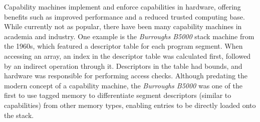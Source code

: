 Capability machines implement and enforce capabilities in hardware, 
offering benefits such as improved performance and a reduced trusted 
computing base. While currently not as popular, there have been many 
capability machines in academia and industry. One example is the \textit{Burroughs B5000} 
stack machine from the 1960s, which featured a descriptor table for each program segment. 
When accessing an array, an index in the descriptor table was calculated first, 
followed by an indirect operation through it. Descriptors in the table had bounds,
 and hardware was responsible for performing access checks. Although predating the 
 modern concept of a capability machine, the \textit{Burroughs B5000} was one of the first 
 to use tagged memory to differentiate segment descriptors (similar to capabilities) 
 from other memory types, enabling entries to be directly loaded onto the stack.
 \newline




